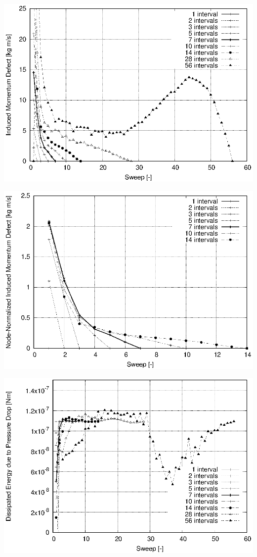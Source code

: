 \documentclass[twoside,a4paper,12pt,bibliography=totoc, parskip=half,english]{scrreprt}
\begin{document}
\includegraphics[scale=1]{13_primal_modef_newton.eps}

\includegraphics[scale=1]{13_primal_modef_newton_zoom.eps}


\includegraphics[scale=1]{12_primal_modef_newton.eps}
\end{document}
